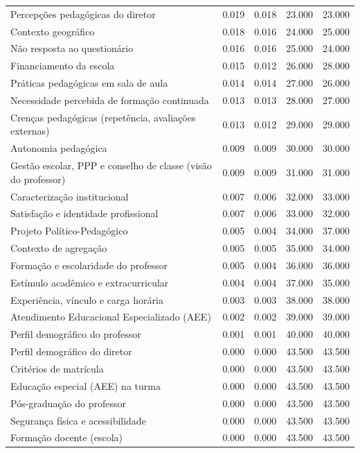 \begin{tabular}{lrrrr}
Percepções pedagógicas do diretor & 0.019 & 0.018 & 23.000 & 23.000 \\
Contexto geográfico & 0.018 & 0.016 & 24.000 & 25.000 \\
Não resposta ao questionário & 0.016 & 0.016 & 25.000 & 24.000 \\
Financiamento da escola & 0.015 & 0.012 & 26.000 & 28.000 \\
Práticas pedagógicas em sala de aula & 0.014 & 0.014 & 27.000 & 26.000 \\
Necessidade percebida de formação continuada & 0.013 & 0.013 & 28.000 & 27.000 \\
Crenças pedagógicas (repetência, avaliações externas) & 0.013 & 0.012 & 29.000 & 29.000 \\
Autonomia pedagógica & 0.009 & 0.009 & 30.000 & 30.000 \\
Gestão escolar, PPP e conselho de classe (visão do professor) & 0.009 & 0.009 & 31.000 & 31.000 \\
Caracterização institucional & 0.007 & 0.006 & 32.000 & 33.000 \\
Satisfação e identidade profissional & 0.007 & 0.006 & 33.000 & 32.000 \\
Projeto Político-Pedagógico & 0.005 & 0.004 & 34.000 & 37.000 \\
Contexto de agregação & 0.005 & 0.005 & 35.000 & 34.000 \\
Formação e escolaridade do professor & 0.005 & 0.004 & 36.000 & 36.000 \\
Estímulo acadêmico e extracurricular & 0.004 & 0.004 & 37.000 & 35.000 \\
Experiência, vínculo e carga horária & 0.003 & 0.003 & 38.000 & 38.000 \\
Atendimento Educacional Especializado (AEE) & 0.002 & 0.002 & 39.000 & 39.000 \\
Perfil demográfico do professor & 0.001 & 0.001 & 40.000 & 40.000 \\
Perfil demográfico do diretor & 0.000 & 0.000 & 43.500 & 43.500 \\
Critérios de matrícula & 0.000 & 0.000 & 43.500 & 43.500 \\
Educação especial (AEE) na turma & 0.000 & 0.000 & 43.500 & 43.500 \\
Pós-graduação do professor & 0.000 & 0.000 & 43.500 & 43.500 \\
Segurança física e acessibilidade & 0.000 & 0.000 & 43.500 & 43.500 \\
Formação docente (escola) & 0.000 & 0.000 & 43.500 & 43.500 \\
\bottomrule
\end{tabular}
